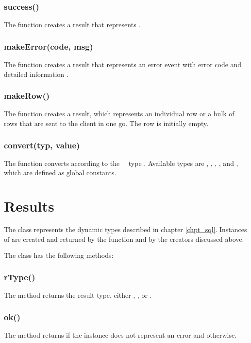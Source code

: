 \subsubsection{success()}
The function creates a  result
that represents .

\subsubsection{makeError(code, msg)}
The function creates a  result
that represents an error event with error code
 and detailed information .

\subsubsection{makeRow()}
The function creates a  result,
which represents an individual row
or a bulk of rows that are sent to the client
in one go.
The row is initially empty.

\subsubsection{convert(typ, value)}
The function converts  according
to the \nowdb\ \sql\ type .
Available types are
, ,
, ,  and
,
which are defined as global constants.

\section{Results}
The  class represents
the dynamic types described in chapter \ref{chpt_sql}.
Instances of  are
created and returned by
the  function
and by the  creators discussed above.

The  class has the following methods:

\subsubsection{rType()}
The method returns the result type,
either ,
,  or .

\subsubsection{ok()}
The method returns 
if the instance does not represent
an error and  otherwise.


